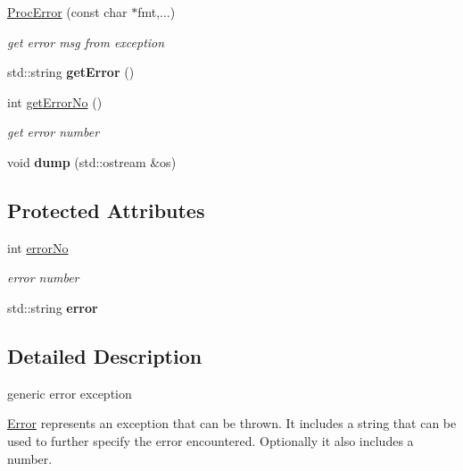 \begin{DoxyCompactItemize}
\mbox{\label{classProcError_ade1a00fb8c459df2f1fd9d04db346092}} 
\hyperlink{classProcError_ade1a00fb8c459df2f1fd9d04db346092}{Proc\+Error} (const char $\ast$fmt,...)
\begin{DoxyCompactList}\small\item\em get error msg from exception \end{DoxyCompactList}\item 
\mbox{\label{classProcError_a3cd2078d3ab4794921b86e1b4cd69519}} 
std\+::string {\bfseries get\+Error} ()
\item 
\mbox{\label{classProcError_a73c98b8bad445fcb90c6011e93edecb2}} 
int \hyperlink{classProcError_a73c98b8bad445fcb90c6011e93edecb2}{get\+Error\+No} ()
\begin{DoxyCompactList}\small\item\em get error number \end{DoxyCompactList}\item 
\mbox{\label{classProcError_a8415fe24bf03c639866cfc04a3dce64e}} 
void {\bfseries dump} (std\+::ostream \&os)
\end{DoxyCompactItemize}
\subsection*{Protected Attributes}
\begin{DoxyCompactItemize}
\item 
int \hyperlink{classProcError_a0bd2a883852f733b07b6b896f5a51d0c}{error\+No}
\begin{DoxyCompactList}\small\item\em error number \end{DoxyCompactList}\item 
\mbox{\label{classProcError_a35664f060a696d177230840b0b248080}} 
std\+::string {\bfseries error}
\end{DoxyCompactItemize}


\subsection{Detailed Description}
generic error exception 

\hyperlink{classError}{Error} represents an exception that can be thrown. It includes a string that can be used to further specify the error encountered. Optionally it also includes a number. 

